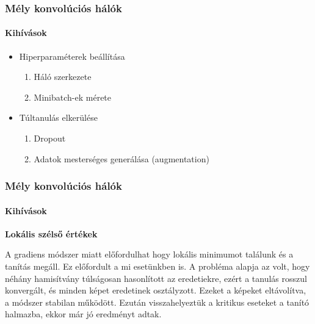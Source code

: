 \documentclass[11pt]{beamer}
\begin{document}
\begin{frame}
\frametitle{Mély konvolúciós hálók}
\framesubtitle{Kihívások}

\begin{itemize}
	\item 
	Hiperparaméterek beállítása
	\begin{enumerate}
		\item 
		Háló szerkezete
		\item 
		Minibatch-ek mérete
	\end{enumerate}
	
	\item 
	Túltanulás elkerülése
	\begin{enumerate}
		\item 
		Dropout
		\item 
		Adatok mesterséges generálása (augmentation)
	\end{enumerate}
	
\end{itemize}

\end{frame}

\begin{frame}
	\frametitle{Mély konvolúciós hálók}
	\framesubtitle{Kihívások}
	
	\textbf{Lokális szélső értékek}
	
	A gradiens módszer miatt előfordulhat hogy lokális minimumot találunk és a tanítás megáll. Ez előfordult a mi esetünkben is. A probléma alapja az volt, hogy néhány hamisítvány túlságosan hasonlított az eredetiekre, ezért a tanulás rosszul konvergált, és minden képet eredetinek osztályzott. Ezeket a képeket eltávolítva, a módszer stabilan működött. Ezután visszahelyeztük a kritikus eseteket a tanító halmazba, ekkor már jó eredményt adtak.
	
	
\end{frame}
\end{document}
